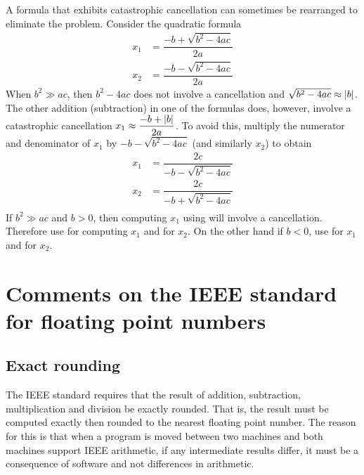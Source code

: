 A formula that exhibits catastrophic cancellation can sometimes be rearranged
to eliminate the problem. Consider the quadratic formula
\begin{equation}
  \begin{split}
    x_{1}&=\dfrac{-b+\sqrt{b^{2}-4ac}}{2a} \\
    x_{2}&=\dfrac{-b-\sqrt{b^{2}-4ac}}{2a}
  \end{split}
  \label{eqn:quadratic}
\end{equation}
When $b^{2}\gg ac$, then $b^{2}-4ac$ does not involve a cancellation and
$\sqrt{b^{2}-4ac}\approx\left| b \right|$. The other addition (subtraction) in one of
the formulas does, however, involve a catastrophic cancellation \eg
$x_{1}\approx\dfrac{-b+\left| b \right|}{2a}$. To avoid this, multiply the numerator
and denominator of $x_{1}$ by $-b-\sqrt{b^{2}-4ac}$ (and similarly $x_{2}$) to
obtain
\begin{equation}
  \begin{split}
    x_{1}&=\dfrac{2c}{-b-\sqrt{b^{2}-4ac}} \\
    x_{2}&=\dfrac{2c}{-b+\sqrt{b^{2}-4ac}} \\
  \end{split}
  \label{eqn:newquadratic}
\end{equation}
If $b^{2}\gg ac$ and $b>0$, then computing $x_{1}$ using 
will involve a cancellation. Therefore use  for
computing $x_{1}$ and  for $x_{2}$. On the other hand if
$b<0$, use  for $x_{1}$ and  for
$x_{2}$.

\section{Comments on the IEEE standard for floating point numbers}
\label{sec:IEEE754Standard}

\subsection{Exact rounding}

The IEEE standard requires that the result of addition, subtraction,
multiplication and division be exactly rounded. That is, the result must be
computed exactly then rounded to the nearest floating point number. The reason
for this is that when a program is moved between two machines and both
machines support IEEE arithmetic, if any intermediate results differ, it must
be a consequence of software and not differences in arithmetic.

